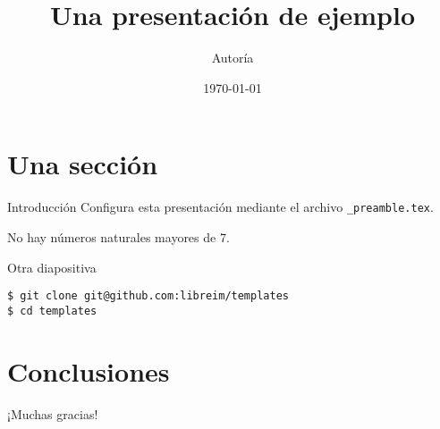 

\title{Una presentación de ejemplo}
\date{\today}
\author{Autoría}


\maketitle
\begin{frame}{\contentsname}
  \tableofcontents
\end{frame}

\section{Una sección}
\begin{frame}{Introducción}
  Configura esta \alert{presentación} mediante el archivo \texttt{\_preamble.tex}.
  
  \begin{theorem}
    No hay números naturales mayores de 7.
  \end{theorem}
\end{frame}

\begin{frame}[fragile]{Otra diapositiva}
\begin{verbatim}
$ git clone git@github.com:libreim/templates
$ cd templates
\end{verbatim}
\end{frame}

\section{Conclusiones}
\begin{frame}[standout]
  ¡Muchas gracias!
\end{frame}

